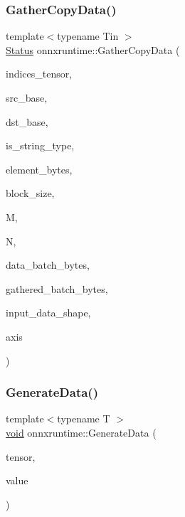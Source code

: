 \subsubsection{\texorpdfstring{Gather\+Copy\+Data()}{GatherCopyData()}}
{\footnotesize\ttfamily template$<$typename Tin $>$ \\
\mbox{\hyperlink{classonnxruntime_1_1common_1_1Status}{Status}} onnxruntime\+::\+Gather\+Copy\+Data (\begin{DoxyParamCaption}\item[{const \mbox{\hyperlink{classonnxruntime_1_1Tensor}{Tensor}} $\ast$}]{indices\+\_\+tensor,  }\item[{const uint8\+\_\+t $\ast$}]{src\+\_\+base,  }\item[{uint8\+\_\+t $\ast$}]{dst\+\_\+base,  }\item[{bool}]{is\+\_\+string\+\_\+type,  }\item[{const \mbox{\hyperlink{mlasi_8h_a503efbc1c6e50825320ad909366b78ab}{size\+\_\+t}}}]{element\+\_\+bytes,  }\item[{const int64\+\_\+t}]{block\+\_\+size,  }\item[{const int64\+\_\+t}]{M,  }\item[{const int64\+\_\+t}]{N,  }\item[{const int64\+\_\+t}]{data\+\_\+batch\+\_\+bytes,  }\item[{const int64\+\_\+t}]{gathered\+\_\+batch\+\_\+bytes,  }\item[{const \mbox{\hyperlink{classonnxruntime_1_1TensorShape}{Tensor\+Shape}} \&}]{input\+\_\+data\+\_\+shape,  }\item[{const int64\+\_\+t}]{axis }\end{DoxyParamCaption})}

\mbox{\label{namespaceonnxruntime_aa6b0bcccd97e0b6ed1b8f4cf5b4c73f1}} 
\subsubsection{\texorpdfstring{Generate\+Data()}{GenerateData()}\hspace{0.1cm}{\footnotesize\ttfamily [1/2]}}
{\footnotesize\ttfamily template$<$typename T $>$ \\
\mbox{\hyperlink{mlasi_8h_a88f941d423cb2a819b70a1358982b1a6}{void}} onnxruntime\+::\+Generate\+Data (\begin{DoxyParamCaption}\item[{\mbox{\hyperlink{classonnxruntime_1_1Tensor}{Tensor}} \&}]{tensor,  }\item[{float}]{value }\end{DoxyParamCaption})}

